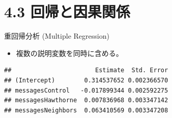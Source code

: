 \documentclass[
  ignorenonframetext,
]{beamer}
\newenvironment{Shaded}{\begin{snugshade}}{\end{snugshade}}
\newcommand{\AttributeTok}[1]{\textcolor[rgb]{0.77,0.63,0.00}{#1}}
\newcommand{\CommentTok}[1]{\textcolor[rgb]{0.56,0.35,0.01}{\textit{#1}}}
\newcommand{\DecValTok}[1]{\textcolor[rgb]{0.00,0.00,0.81}{#1}}
\newcommand{\FunctionTok}[1]{\textcolor[rgb]{0.00,0.00,0.00}{#1}}
\newcommand{\NormalTok}[1]{#1}
\newcommand{\OtherTok}[1]{\textcolor[rgb]{0.56,0.35,0.01}{#1}}
\newcommand{\SpecialCharTok}[1]{\textcolor[rgb]{0.00,0.00,0.00}{#1}}
\newcommand{\StringTok}[1]{\textcolor[rgb]{0.31,0.60,0.02}{#1}}
\providecommand{\tightlist}{%
  \setlength{\itemsep}{0pt}\setlength{\parskip}{0pt}}
\begin{document}
\hypertarget{ux56deux5e30ux3068ux56e0ux679cux95a2ux4fc2}{%
\section{4.3
回帰と因果関係}\label{ux56deux5e30ux3068ux56e0ux679cux95a2ux4fc2}}

\begin{frame}[fragile]{重回帰分析 (Multiple Regression)}
\protect\hypertarget{ux91cdux56deux5e30ux5206ux6790-multiple-regression}{}
\begin{itemize}
\tightlist
\item
  複数の説明変数を同時に含める。
\end{itemize}

\scriptsize

\begin{Shaded}
\end{Shaded}

\begin{verbatim}
##                       Estimate  Std. Error
## (Intercept)        0.314537652 0.002366570
## messagesControl   -0.017899344 0.002592275
## messagesHawthorne  0.007836968 0.003347142
## messagesNeighbors  0.063410569 0.003347208
\end{verbatim}

\normalsize
\end{frame}
\end{document}

